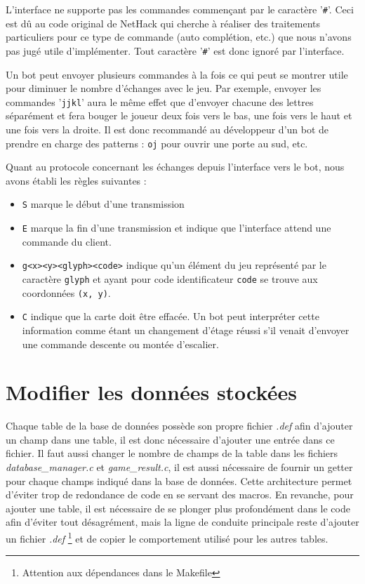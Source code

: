 \documentclass[10pt,a4paper]{report}
\begin{document}
L'interface ne supporte pas les commandes commençant par le caractère '\verb!#!'. Ceci est dû au code original de NetHack qui cherche à réaliser des traitements particuliers pour ce type de commande (auto complétion, etc.) que nous n'avons pas jugé utile d'implémenter. Tout caractère '\verb!#!' est donc ignoré par l'interface.

Un bot peut envoyer plusieurs commandes à la fois ce qui peut se montrer utile pour diminuer le nombre d'échanges avec le jeu. Par exemple, envoyer les commandes '\verb!jjkl!' aura le même effet que d'envoyer chacune des lettres séparément et fera bouger le joueur deux fois vers le bas, une fois vers le haut et une fois vers la droite. Il est donc recommandé au développeur d'un bot de prendre en charge des patterns : \verb!oj! pour ouvrir une porte au sud, etc.

Quant au protocole concernant les échanges depuis l'interface vers le bot, nous avons établi les règles suivantes :
\begin{itemize}
	\item \verb!S! marque le début d'une transmission
	\item \verb!E! marque la fin d'une transmission et indique que l'interface attend une commande du client.
	\item \verb!g<x><y><glyph><code>! indique qu'un élément du jeu représenté par le caractère \verb!glyph! et ayant pour code identificateur \verb!code! se trouve aux coordonnées \verb!(x, y)!.
	\item \verb!C! indique que la carte doit être effacée. Un bot peut interpréter cette information comme étant un changement d'étage réussi s'il venait d'envoyer une commande descente ou montée d'escalier.
\end{itemize}

\section{Modifier les données stockées} \label{sec:modif-bdd}
Chaque table de la base de données possède son propre fichier \emph{.def} afin
d'ajouter un champ dans une table, il est donc nécessaire d'ajouter une entrée
dans ce fichier. Il faut aussi changer le nombre de champs de la table dans les
fichiers \emph{database\_manager.c} et \emph{game\_result.c}, il est aussi
nécessaire de fournir un getter pour chaque champs indiqué dans la base de
données. Cette architecture permet d'éviter trop de redondance de code en se
servant des macros. En revanche, pour ajouter une table, il est nécessaire de se
plonger plus profondément dans le code afin d'éviter tout désagrément, mais la
ligne de conduite principale reste d'ajouter un fichier \emph{.def}
\footnote{Attention aux dépendances dans le Makefile} et de copier le
comportement utilisé pour les autres tables.
\end{document}

